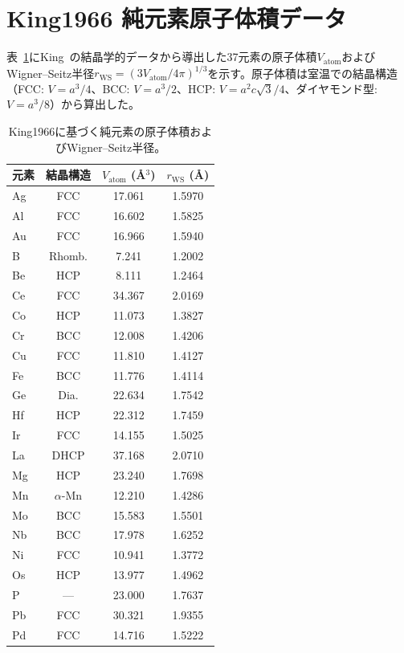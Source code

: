 \documentclass[a4paper,10pt,5p]{elsarticle}
\begin{document}
\section{King1966 純元素原子体積データ}
\label{appendix:king}

表~\ref{tab:appendix_king}にKing~\cite{king1966}の結晶学的データから導出した37元素の原子体積$V_\mathrm{atom}$およびWigner--Seitz半径$r_\mathrm{WS} = (3V_\mathrm{atom}/4\pi)^{1/3}$を示す。原子体積は室温での結晶構造（FCC: $V = a^3/4$、BCC: $V = a^3/2$、HCP: $V = a^2c\sqrt{3}/4$、ダイヤモンド型: $V = a^3/8$）から算出した。

\begin{table}[htbp]
\centering
\caption{King1966に基づく純元素の原子体積およびWigner--Seitz半径。}
\label{tab:appendix_king}
\begin{tabular}{lccc}
\hline
\textbf{元素} & \textbf{結晶構造} & $V_\mathrm{atom}$ (\AA$^3$) & $r_\mathrm{WS}$ (\AA) \\
\hline
Ag & FCC & 17.061 & 1.5970 \\
Al & FCC & 16.602 & 1.5825 \\
Au & FCC & 16.966 & 1.5940 \\
B  & Rhomb. & 7.241 & 1.2002 \\
Be & HCP & 8.111 & 1.2464 \\
Ce & FCC & 34.367 & 2.0169 \\
Co & HCP & 11.073 & 1.3827 \\
Cr & BCC & 12.008 & 1.4206 \\
Cu & FCC & 11.810 & 1.4127 \\
Fe & BCC & 11.776 & 1.4114 \\
Ge & Dia. & 22.634 & 1.7542 \\
Hf & HCP & 22.312 & 1.7459 \\
Ir & FCC & 14.155 & 1.5025 \\
La & DHCP & 37.168 & 2.0710 \\
Mg & HCP & 23.240 & 1.7698 \\
Mn & $\alpha$-Mn & 12.210 & 1.4286 \\
Mo & BCC & 15.583 & 1.5501 \\
Nb & BCC & 17.978 & 1.6252 \\
Ni & FCC & 10.941 & 1.3772 \\
Os & HCP & 13.977 & 1.4962 \\
P  & --- & 23.000 & 1.7637 \\
Pb & FCC & 30.321 & 1.9355 \\
Pd & FCC & 14.716 & 1.5222 \\

\end{tabular}
\end{table}
\end{document}
